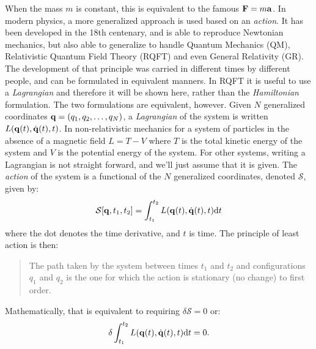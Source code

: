 When the mass $m$ is constant, this is equivalent to the famous $\vb{F}=m\vb{a}$. In modern physics, a more generalized approach is used based on an \emph{action}. It has been developed in the 18th centenary, and is able to reproduce Newtonian mechanics, but also able to generalize to handle Quantum Mechanics (QM), Relativistic Quantum Field Theory (RQFT) and even General Relativity (GR). The development of that principle was carried in different times by different people, and can be formulated in equivalent manners. In RQFT it is useful to use a \emph{Lagrangian} and therefore it will be shown here, rather than the \emph{Hamiltonian} formulation. The two formulations are equivalent, however. Given $N$ generalized coordinates $\vb{q}=\qty(q_1,q_2,\ldots,q_N)$, a \emph{Lagrangian} of the system is written $L\qty( \vb{q}\qty(t), \dot{\vb{q}}\qty(t), t )$. In non-relativistic mechanics for a system of particles in the absence of a magnetic field  $L=T-V$ where $T$ is the total kinetic energy of the system and $V$ is the potential energy of the system. For other systems, writing a Lagrangian is not straight forward, and we'll just assume that it is given. The \emph{action} of the system is a functional of the $N$ generalized coordinates, denoted $\mathcal{S}$, given by:
\begin{equation}
\mathcal{S}\qty[ \vb{q}, t_1, t_2 ] = \int^{t_2}_{t_1} L\qty( \vb{q}\qty(t), \dot{\vb{q}}\qty(t), t ) \dd t
\end{equation}
where the dot denotes the time derivative, and $t$ is time. The principle of least action is then:
\begin{quote}
The path taken by the system between times $t_1$ and $t_2$ and configurations $q_1$ and $q_2$ is the one for which the action is stationary (no change) to first order.
\end{quote}
Mathematically, that is equivalent to requiring $\delta \mathcal{S}=0$ or:
\begin{equation}
\delta \int^{t_2}_{t_1} L\qty( \vb{q}\qty(t), \dot{\vb{q}}\qty(t), t ) \dd t = 0.
\label{eq:principle-of-least-action}
\end{equation}

